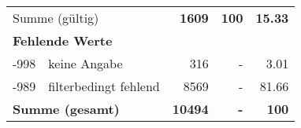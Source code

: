 \begin{longtable}{lXrrr}
     \midrule
     \multicolumn{2}{l}{Summe (gültig)} &
       \textbf{\num{1609}} &
     \textbf{100} &
       \textbf{\num[round-mode=places,round-precision=2]{15,33}} \\
     \multicolumn{5}{l}{\textbf{Fehlende Werte}}\\
       -998 &
       keine Angabe &
         \num{316} &
        - &
         \num[round-mode=places,round-precision=2]{3,01} \\
       -989 &
       filterbedingt fehlend &
         \num{8569} &
        - &
         \num[round-mode=places,round-precision=2]{81,66} \\
     \midrule
     \multicolumn{2}{l}{\textbf{Summe (gesamt)}} &
          \textbf{\num{10494}} &
        \textbf{-} &
        \textbf{100} \\
     \bottomrule
     \end{longtable}
     
